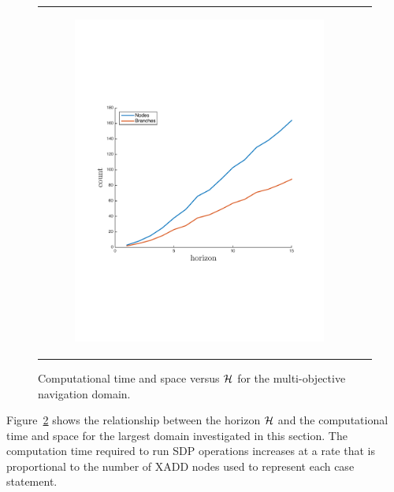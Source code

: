 \begin{figure}[ht]
\begin{tabular}{cc}
            \begin{subfigure}[b]{0.24\textwidth}\centering \includegraphics[width=\textwidth]{images/space_plot_new}
                \label{fig:space_complexity}\end{subfigure}
            \\
        \end{tabular}
        \caption{Computational time and space versus {\footnotesize $ \mathcal{H} $} for the multi-objective navigation domain.}
        \label{fig:time_space_complexity}    
    \end{figure}

Figure~\ref{fig:time_space_complexity} shows the relationship between the horizon {\footnotesize $ \mathcal{H} $} and the computational time and space for the largest domain investigated in this section. 
The computation time required to run SDP operations increases at a rate that is proportional to the number of XADD nodes used to represent each case statement.